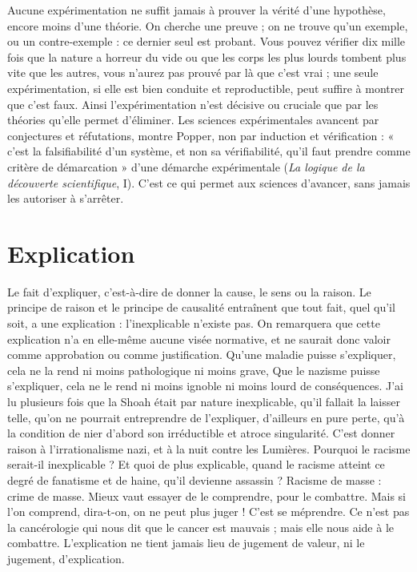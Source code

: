 Aucune expérimentation ne suffit jamais à prouver la vérité d’une hypothèse,
encore moins d’une théorie. On cherche une preuve ; on ne trouve
qu'un exemple, ou un contre-exemple : ce dernier seul est probant. Vous
pouvez vérifier dix mille fois que la nature a horreur du vide ou que les corps
les plus lourds tombent plus vite que les autres, vous n’aurez pas prouvé par là
que c’est vrai ; une seule expérimentation, si elle est bien conduite et reproductible,
peut suffire à montrer que c’est faux. Ainsi l’expérimentation n’est décisive
ou cruciale que par les théories qu’elle permet d’éliminer. Les sciences
expérimentales avancent par conjectures et réfutations, montre Popper, non
par induction et vérification : « c’est la falsifiabilité d’un système, et non sa vérifiabilité,
qu’il faut prendre comme critère de démarcation » d’une démarche
expérimentale ({\it La logique de la découverte scientifique}, I). C’est ce qui permet
aux sciences d’avancer, sans jamais les autoriser à s’arrêter.

\section{Explication}
Le fait d'expliquer, c’est-à-dire de donner la cause, le sens
ou la raison. Le principe de raison et le principe de causalité
entraînent que tout fait, quel qu’il soit, a une explication : l’inexplicable
n'existe pas. On remarquera que cette explication n’a en elle-même aucune
visée normative, et ne saurait donc valoir comme approbation ou comme justification.
Qu’une maladie puisse s'expliquer, cela ne la rend ni moins pathologique
ni moins grave, Que le nazisme puisse s’expliquer, cela ne le rend ni
moins ignoble ni moins lourd de conséquences. J'ai lu plusieurs fois que la
Shoah était par nature inexplicable, qu’il fallait la laisser telle, qu’on ne pourrait
entreprendre de l'expliquer, d’ailleurs en pure perte, qu’à la condition de nier
d’abord son irréductible et atroce singularité. C’est donner raison à l’irrationalisme
nazi, et à la nuit contre les Lumières. Pourquoi le racisme serait-il
inexplicable ? Et quoi de plus explicable, quand le racisme atteint ce degré de
fanatisme et de haine, qu’il devienne assassin ? Racisme de masse : crime de
masse. Mieux vaut essayer de le comprendre, pour le combattre. Mais si l’on
comprend, dira-t-on, on ne peut plus juger ! C’est se méprendre. Ce n’est pas
la cancérologie qui nous dit que le cancer est mauvais ; mais elle nous aide à le
combattre. L’explication ne tient jamais lieu de jugement de valeur, ni le jugement,
d'explication.

